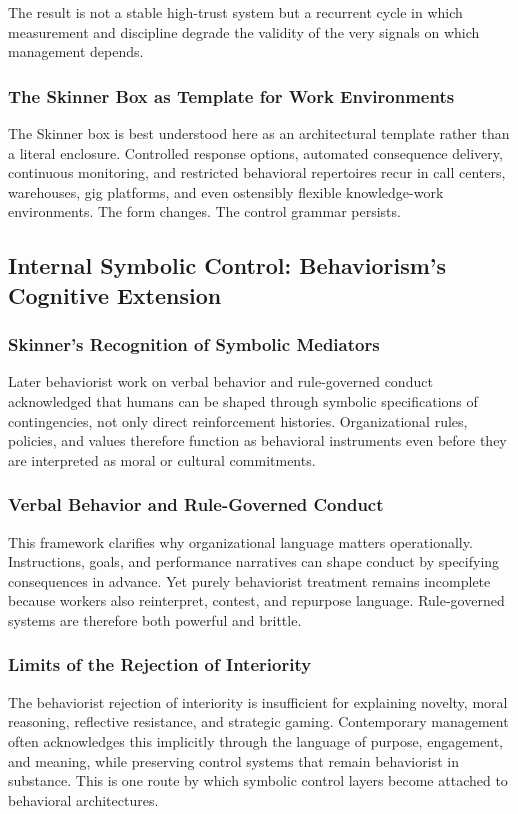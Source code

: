 \documentclass[11pt, a4paper]{article}
\begin{document}
The result is not a stable high-trust system but a recurrent cycle in which measurement and discipline degrade the validity of the very signals on which management depends.

\subsubsection{The Skinner Box as Template for Work Environments}
The Skinner box is best understood here as an architectural template rather than a literal enclosure. Controlled response options, automated consequence delivery, continuous monitoring, and restricted behavioral repertoires recur in call centers, warehouses, gig platforms, and even ostensibly flexible knowledge-work environments. The form changes. The control grammar persists.

\subsection{Internal Symbolic Control: Behaviorism's Cognitive Extension}

\subsubsection{Skinner's Recognition of Symbolic Mediators}
Later behaviorist work on verbal behavior and rule-governed conduct acknowledged that humans can be shaped through symbolic specifications of contingencies, not only direct reinforcement histories. Organizational rules, policies, and values therefore function as behavioral instruments even before they are interpreted as moral or cultural commitments.

\subsubsection{Verbal Behavior and Rule-Governed Conduct}
This framework clarifies why organizational language matters operationally. Instructions, goals, and performance narratives can shape conduct by specifying consequences in advance. Yet purely behaviorist treatment remains incomplete because workers also reinterpret, contest, and repurpose language. Rule-governed systems are therefore both powerful and brittle.

\subsubsection{Limits of the Rejection of Interiority}
The behaviorist rejection of interiority is insufficient for explaining novelty, moral reasoning, reflective resistance, and strategic gaming. Contemporary management often acknowledges this implicitly through the language of purpose, engagement, and meaning, while preserving control systems that remain behaviorist in substance. This is one route by which symbolic control layers become attached to behavioral architectures.
\end{document}

